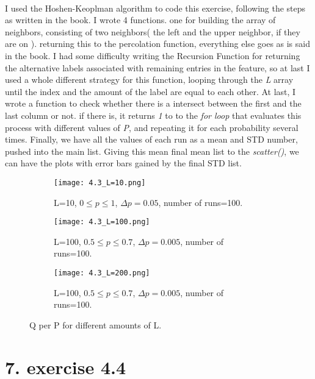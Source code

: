 \documentclass[12pt]{article}
\begin{document}
\paragraph*{} I used the Hoshen-Keoplman algorithm to code this exercise, following the steps as written in the book. I wrote 4 functions. one for building the array of neighbors, consisting of two neighbors( the left and the upper neighbor, if they are on ). returning this to the percolation function, everything else goes as is said in the book. I had some difficulty writing the Recursion Function for returning the alternative labels associated with remaining entries in the feature, so at last I used a whole different strategy for this function, looping through the \textit{L} array until the index and the amount of the label are equal to each other. At last, I wrote a function to check whether there is a intersect between the first and the last column or not. if there is, it returns \textit{1} to to the \textit{for loop} that evaluates this process with different values of \textit{P}, and repeating it for each probability several times. Finally, we have all the values of each run as a mean and STD number, pushed into the main list. Giving this mean final mean list to the \textit{scatter()}, we can have the plots with error bars gained by the final STD list. 
\begin{figure}[H]
	\begin{subfigure}[t]{0.45\textwidth}
		\centering
		\texttt{[image: 4.3\_L=10.png]}
		\label{fig:mesh7.1}
		\caption{L=10, $0 \leq p \leq 1$, $\Delta p=0.05$, number of runs=100.}
	\end{subfigure}\hfill
	\begin{subfigure}[t]{0.45\textwidth}
		\centering
		\texttt{[image: 4.3\_L=100.png]}
		\label{fig:mesh7.2}
		\caption{L=100, $0.5 \leq p \leq 0.7$, $\Delta p=0.005$, number of runs=100.}
	\end{subfigure}\hfill
	\begin{subfigure}[t]{0.45\textwidth}
		\centering
		\texttt{[image: 4.3\_L=200.png]}
		\label{fig:mesh7.3}
		\caption{L=100, $0.5 \leq p \leq 0.7$, $\Delta p=0.005$, number of runs=100.}
	\end{subfigure}
	\centering
	\label{fig:mesh7}
	\caption{Q per P for different amounts of L. }
\end{figure}

\part*{7. exercise 4.4}
\end{document}

